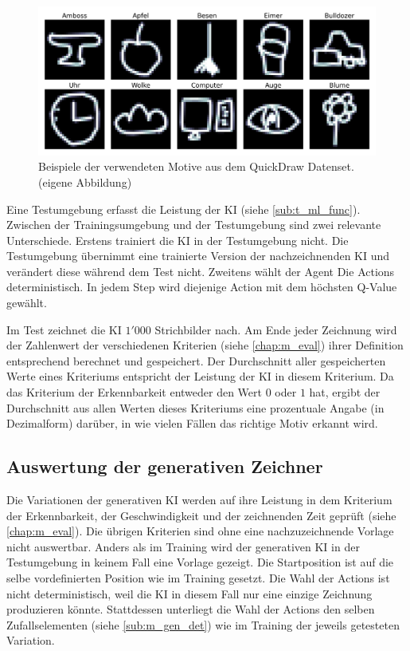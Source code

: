 \begin{figure}[!ht]
    \centering
    \includegraphics[width=\textwidth]{images/methode/quickdraw-examples.png}
    \caption{Beispiele der verwendeten Motive aus dem QuickDraw Datenset. (eigene Abbildung)}\label{fig:quickdraw-examples}
\end{figure}

\newpage

Eine Testumgebung erfasst die Leistung der KI (siehe \ref{sub:t_ml_func}).
Zwischen der Trainingsumgebung und der Testumgebung sind zwei relevante
Unterschiede. Erstens trainiert die KI in der Testumgebung nicht. Die
Testumgebung übernimmt eine trainierte Version der nachzeichnenden KI und
verändert diese während dem Test nicht. Zweitens wählt der Agent Die Actions
deterministisch. In jedem Step wird diejenige Action mit dem höchsten Q-Value
gewählt.

Im Test zeichnet die KI $1'000$ Strichbilder nach. Am Ende jeder Zeichnung wird
der Zahlenwert der verschiedenen Kriterien (siehe \ref{chap:m_eval}) ihrer
Definition entsprechend berechnet und gespeichert. Der Durchschnitt aller
gespeicherten Werte eines Kriteriums entspricht der Leistung der KI in diesem
Kriterium. Da das Kriterium der Erkennbarkeit entweder den Wert $0$ oder $1$
hat, ergibt der Durchschnitt aus allen Werten dieses Kriteriums eine prozentuale
Angabe (in Dezimalform) darüber, in wie vielen Fällen das richtige Motiv erkannt
wird.



\newpage

\subsection{Auswertung der generativen Zeichner}\label{sub:m_auswert_gen}

Die Variationen der generativen KI werden auf ihre Leistung in dem Kriterium der
Erkennbarkeit, der Geschwindigkeit und der zeichnenden Zeit geprüft (siehe
\ref{chap:m_eval}). Die übrigen Kriterien sind ohne eine
nachzuzeichnende Vorlage nicht auswertbar. Anders als im Training wird der
generativen KI in der Testumgebung in keinem Fall eine Vorlage gezeigt. Die
Startposition ist auf die selbe vordefinierten Position wie im Training gesetzt.
Die Wahl der Actions ist nicht deterministisch, weil die KI in diesem Fall nur
eine einzige Zeichnung produzieren könnte. Stattdessen unterliegt die Wahl der
Actions den selben Zufallselementen (siehe \ref{sub:m_gen_det}) wie im
Training der jeweils getesteten Variation.

